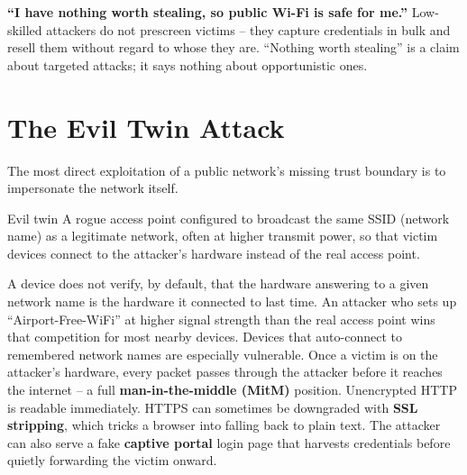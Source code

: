 \begin{misconception}
\textbf{``I have nothing worth stealing, so public Wi-Fi is safe for me.''} Low-skilled
attackers do not prescreen victims -- they capture credentials in bulk and resell them without
regard to whose they are. ``Nothing worth stealing'' is a claim about targeted attacks; it says
nothing about opportunistic ones.
\end{misconception}

\section{The Evil Twin Attack}

The most direct exploitation of a public network's missing trust boundary is to impersonate the
network itself.

\begin{definition}{Evil twin}
A rogue access point configured to broadcast the same SSID (network name) as a legitimate
network, often at higher transmit power, so that victim devices connect to the attacker's
hardware instead of the real access point.
\end{definition}

A device does not verify, by default, that the hardware answering to a given network name is the
hardware it connected to last time. An attacker who sets up ``Airport-Free-WiFi'' at higher
signal strength than the real access point wins that competition for most nearby devices.
Devices that auto-connect to remembered network names are especially vulnerable. Once a victim
is on the attacker's hardware, every packet passes through the attacker before it reaches the
internet -- a full \textbf{man-in-the-middle (MitM)} position. Unencrypted HTTP is readable
immediately. HTTPS can sometimes be downgraded with \textbf{SSL stripping}, which tricks a
browser into falling back to plain text. The attacker can also serve a fake
\textbf{captive portal} login page that harvests credentials before quietly forwarding the
victim onward.

